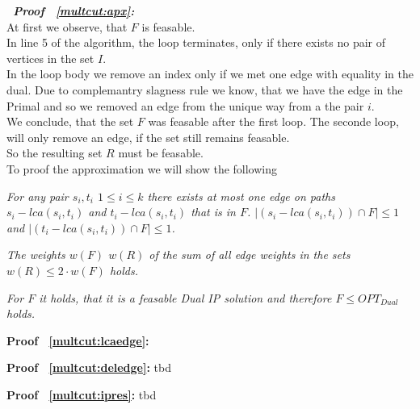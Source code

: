\begin{description}
   \item{\bfseries\itshape~Proof ~\ref{multcut:apx}:}\\
      At first we observe, that $F$ is feasable.\\
      In line 5 of the algorithm, the loop terminates, only
      if there exists no pair of vertices in the set $I$.\\
      In the loop body we remove an index only if we met one
      edge with equality in the dual. Due to complemantry slagness rule
      we know, that we have the edge in the Primal and so we removed an
      edge from the unique way from a the pair $i$.\\
      We conclude, that the set $F$ was feasable after the first loop.
      The seconde loop, will only remove an edge, if the set still remains feasable.\\
      So the resulting set $R$ must be feasable.\\

      To proof the approximation we will show the following
      \begin{lemma}\label{multcut:lcaedge}\mdseries\itshape
         For any pair $s_i,t_i$ $1\leq i \leq k$ there
         exists at most one edge on paths $s_i - lca(s_i,t_i)$ and
         $t_i - lca(s_i,t_i)$ that is in $F$.
         $|(s_i - lca(s_i,t_i)) \cap F| \leq 1$ and
         $|(t_i - lca(s_i,t_i)) \cap F| \leq 1$.
      \end{lemma}

      \begin{lemma}\label{multcut:deledge}\mdseries\itshape
         The weights $w(F)$ $w(R)$ of the sum
         of all edge weights in the sets
         $w(R) \leq 2 \cdot w(F)$ holds.
      \end{lemma}

      \begin{lemma}\label{multcut:ipres}\mdseries\itshape
         For $F$ it holds, that it is a feasable Dual IP solution
         and therefore $F \leq OPT_{Dual}$ holds.
      \end{lemma}

      \begin{description}
         \item{\bfseries Proof ~\ref{multcut:lcaedge}:}
            
         \item{\bfseries Proof ~\ref{multcut:deledge}:} tbd

         \item{\bfseries Proof ~\ref{multcut:ipres}:} tbd
      \end{description}
\end{description}
